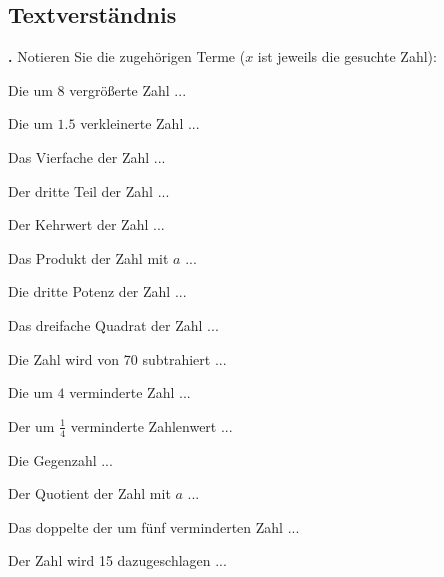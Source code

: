 \newpage

\subsection{Textverständnis}
\textbf{\bbwAufgabenNummer{}.}
Notieren Sie die zugehörigen Terme ($x$ ist jeweils die gesuchte Zahl):


\begin{bbwAufgabenBlock}
\item Die um $8$ vergrößerte Zahl ... 
\item Die um $1.5$ verkleinerte Zahl ... 
\item Das Vierfache der Zahl ... 
\item Der dritte Teil der Zahl ... 
\item Der Kehrwert der Zahl ... 
\item Das Produkt der Zahl mit $a$ ... 
\item Die dritte Potenz der Zahl ... 
\item Das dreifache Quadrat der Zahl ... 
\item Die Zahl wird von 70 subtrahiert ... 
\item Die um $4$ verminderte Zahl ... 
\item Der um $\frac14$ verminderte Zahlenwert ... 
\item Die Gegenzahl ... 
\item Der Quotient der Zahl mit $a$ ... 
\item Das doppelte der um fünf verminderten Zahl
... 
\item Der Zahl wird 15 dazugeschlagen ... 
\end{bbwAufgabenBlock}

\platzFuerBerechnungenBisEndeSeite{}
\newpage

